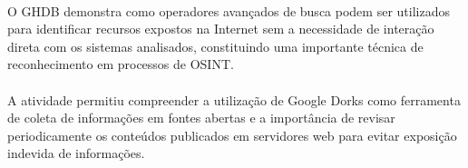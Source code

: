\paragraph{}
O GHDB demonstra como operadores avançados de busca podem ser utilizados para
identificar recursos expostos na Internet sem a necessidade de interação direta
com os sistemas analisados, constituindo uma importante técnica de
reconhecimento em processos de OSINT.

\paragraph{}
A atividade permitiu compreender a utilização de Google Dorks como ferramenta
de coleta de informações em fontes abertas e a importância de revisar
periodicamente os conteúdos publicados em servidores web para evitar exposição
indevida de informações.
